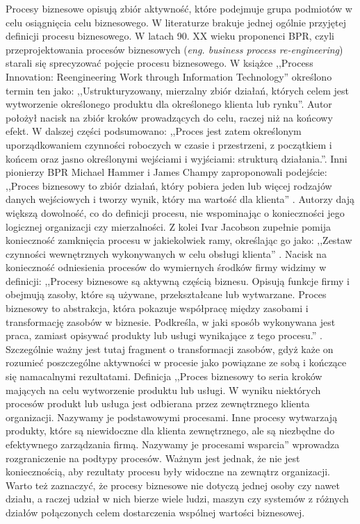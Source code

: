 Procesy biznesowe opisują zbiór aktywność, które podejmuje grupa podmiotów w celu osiągnięcia celu biznesowego. W literaturze brakuje jednej ogólnie przyjętej definicji procesu biznesowego. W latach 90. XX wieku proponenci BPR, czyli przeprojektowania procesów biznesowych (\textit{eng. business process re-engineering}) starali się sprecyzować pojęcie procesu biznesowego. W książce ,,Process Innovation: Reengineering Work through Information Technology'' \cite{davenport1993process} określono termin ten jako: ,,Ustrukturyzowany, mierzalny zbiór działań, których celem jest wytworzenie określonego produktu dla określonego klienta lub rynku''. Autor położył nacisk na zbiór kroków prowadzących do celu, raczej niż na końcowy efekt. W dalszej części podsumowano: ,,Proces jest zatem określonym uporządkowaniem czynności roboczych w czasie i przestrzeni, z początkiem i końcem oraz jasno określonymi wejściami i wyjściami: strukturą działania.''. Inni pionierzy BPR Michael Hammer i James Champy zaproponowali  podejście: ,,Proces biznesowy to zbiór działań, który pobiera jeden lub więcej rodzajów danych wejściowych i tworzy wynik, który ma wartość dla klienta'' \cite{HAMMER199390}. Autorzy dają większą dowolność, co do definicji procesu, nie wspominając o konieczności jego logicznej organizacji czy mierzalności. Z kolei Ivar Jacobson zupełnie pomija konieczność zamknięcia procesu w jakiekolwiek ramy, określając go jako: ,,Zestaw czynności wewnętrznych wykonywanych w celu obsługi klienta'' \cite{JacobsonObjectAdvantage}. Nacisk na konieczność odniesienia procesów do wymiernych środków firmy widzimy w definicji: ,,Procesy biznesowe są aktywną częścią biznesu. Opisują funkcje firmy i obejmują zasoby, które są używane, przekształcane lub wytwarzane. Proces biznesowy to abstrakcja, która pokazuje współpracę między zasobami i transformację zasobów w biznesie. Podkreśla, w jaki sposób wykonywana jest praca, zamiast opisywać produkty lub usługi wynikające z tego procesu.'' \cite{Eriksson2000BusinessMW}. Szczególnie ważny jest tutaj fragment o transformacji zasobów, gdyż każe on rozumieć poszczególne aktywności w procesie jako powiązane ze sobą i kończące się namacalnymi rezultatami. Definicja ,,Proces biznesowy to seria kroków mających na celu wytworzenie produktu lub usługi. W wyniku niektórych procesów produkt lub usługa jest odbierana przez zewnętrznego klienta organizacji. Nazywamy je podstawowymi procesami. Inne procesy wytwarzają produkty, które są niewidoczne dla klienta zewnętrznego, ale są niezbędne do efektywnego zarządzania firmą. Nazywamy je procesami wsparcia'' \cite{rummler_brache_1995} wprowadza rozgraniczenie na podtypy procesów. Ważnym jest jednak, że nie jest koniecznością, aby rezultaty procesu były widoczne na zewnątrz organizacji. Warto też zaznaczyć, że procesy biznesowe nie dotyczą jednej osoby czy nawet działu, a raczej udział w nich bierze wiele ludzi, maszyn czy systemów z różnych działów połączonych celem dostarczenia wspólnej wartości biznesowej.

